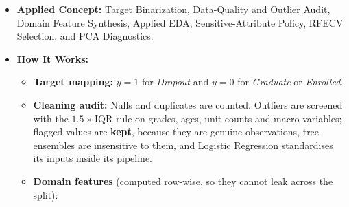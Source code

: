 \documentclass[11pt]{article}
\providecommand{\tightlist}{%
      \setlength{\itemsep}{0pt}\setlength{\parskip}{0pt}}
\begin{document}
\begin{itemize}
\tightlist
\item
  \textbf{Applied Concept:} Target Binarization, Data-Quality and
  Outlier Audit, Domain Feature Synthesis, Applied EDA,
  Sensitive-Attribute Policy, RFECV Selection, and PCA Diagnostics.
\item
  \textbf{How It Works:}

  \begin{itemize}
  \tightlist
  \item
    \textbf{Target mapping:} \(y = 1\) for \emph{Dropout} and \(y = 0\)
    for \emph{Graduate} or \emph{Enrolled}.
  \item
    \textbf{Cleaning audit:} Nulls and duplicates are counted. Outliers
    are screened with the \(1.5 \times \text{IQR}\) rule on grades,
    ages, unit counts and macro variables; flagged values are
    \textbf{kept}, because they are genuine observations, tree ensembles
    are insensitive to them, and Logistic Regression standardises its
    inputs inside its pipeline.
  \item
    \textbf{Domain features} (computed row-wise, so they cannot leak
    across the split):


\end{itemize}
\end{itemize}
\end{document}
